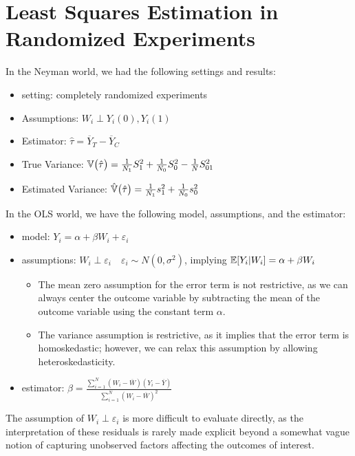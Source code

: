 \newpage
\section{Least Squares Estimation in Randomized Experiments}

In the Neyman world, we had the following settings and results:

\begin{itemize}
    \item setting: completely randomized experiments
    \item Assumptions: $W_i \perp Y_i(0), Y_i(1)$
    \item Estimator: $\hat\tau = \overline{Y}_T - \overline{Y}_C$
    \item True Variance: ${\mathbb{V}} \bigl(\hat\tau\bigr) = \frac{1}{N_1}S_1^2 + \frac{1}{N_0}S_0^2 - \frac{1}{N}S_{01}^2$
    \item Estimated Variance: $\hat{{\mathbb{V}}} \bigl(\hat\tau\bigr) = \frac{1}{N_1}s_1^2 + \frac{1}{N_0}s_0^2$
\end{itemize}


In the OLS world, we have the following model, assumptions, and the estimator:

\begin{itemize}
    \item model: $Y_i = \alpha + \beta W_i + \varepsilon_i$
    \item assumptions: $W_i \perp \varepsilon_i \quad \varepsilon_i \sim N(0, \sigma^2)$, implying ${\mathbb{E}}[Y_i|W_i] = \alpha + \beta W_i$
    \begin{itemize}
        \item The mean zero assumption for the error term is not restrictive, as we can always center the outcome variable by subtracting the mean of the outcome variable using the constant term $\alpha$.
        \item The variance assumption is restrictive, as it implies that the error term is homoskedastic; however, we can relax this assumption by allowing heteroskedasticity.
    \end{itemize}
    \item estimator: $\hat\beta = \frac{\sum_{i=1}^N (W_i - \overline{W})(Y_i - \overline{Y})}{\sum_{i=1}^N (W_i - \overline{W})^2}$
\end{itemize}


The assumption of $W_i \perp \varepsilon_i$ is more difficult to evaluate directly, as the interpretation of these residuals is rarely made explicit beyond a somewhat vague notion of capturing unobserved factors affecting the outcomes of interest.

